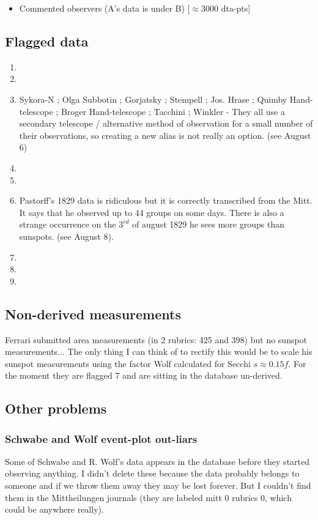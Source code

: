 \documentclass[12pt]{article}
\begin{document}
\begin{itemize}
    \item Commented observers (A's data is under B) [$\approx 3000$ dta-pts]
\end{itemize}

\subsection{Flagged data}
\begin{enumerate}
    \item 
    \item 
    \item Sykora-N ; Olga Subbotin ; Gorjatsky ; Stempell ; Jos. Hrase ; Quimby Hand-telescope ; Broger Hand-telescope ; Tacchini ; Winkler - They all use a secondary telescope / alternative method of observation for a small number of their observations, so creating a new alias is not really an option. (see August 6)
    \item 
    \item 
    \item Pastorff's 1829 data is ridiculous but it is correctly transcribed from the Mitt. It says that he observed up to 44 groups on some days. There is also a strange occurrence on the $3^{rd}$ of august 1829 he sees more groups than sunspots. (see August 8). 
    \item 
    \item 
    \item 
\end{enumerate}



\subsection{Non-derived measurements}
Ferrari submitted area measurements (in 2 rubrics: 425 and 398) but no sunspot measurements... The only thing I can think of to rectify this would be to scale his sunspot measurements using the factor Wolf calculated for Secchi $s \approx 0.15 f$. For the moment they are flagged 7 and are sitting in the database un-derived.

\subsection{Other problems}
\subsubsection{Schwabe and Wolf event-plot out-liars}
Some of Schwabe and R. Wolf's data appears in the database before they started observing anything. I didn't delete these because the data probably belongs to someone and if we throw them away they may be lost forever. But I couldn't find them in the Mittheilungen journals (they are labeled mitt 0 rubrics 0, which could be anywhere really).
\end{document}
